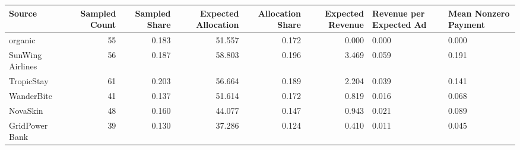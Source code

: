 \begin{tabular}{lrrrrr}
\hline
Source & Sampled Count & Sampled Share & Expected Allocation & Allocation Share & Expected Revenue & Revenue per Expected Ad & Mean Nonzero Payment \\
\hline
organic & 55 & 0.183 & 51.557 & 0.172 & 0.000 & 0.000 & 0.000 \\
SunWing Airlines & 56 & 0.187 & 58.803 & 0.196 & 3.469 & 0.059 & 0.191 \\
TropicStay & 61 & 0.203 & 56.664 & 0.189 & 2.204 & 0.039 & 0.141 \\
WanderBite & 41 & 0.137 & 51.614 & 0.172 & 0.819 & 0.016 & 0.068 \\
NovaSkin & 48 & 0.160 & 44.077 & 0.147 & 0.943 & 0.021 & 0.089 \\
GridPower Bank & 39 & 0.130 & 37.286 & 0.124 & 0.410 & 0.011 & 0.045 \\
\hline
\end{tabular}
